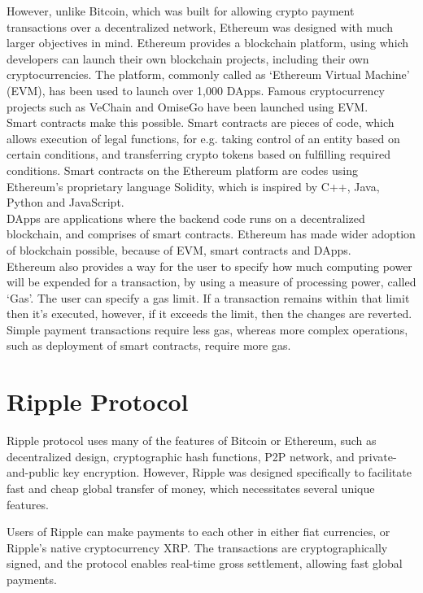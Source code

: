 However, unlike Bitcoin, which was built for allowing crypto payment transactions over a decentralized network, Ethereum was designed with much larger objectives in mind. Ethereum provides a blockchain platform, using which developers can launch their own blockchain projects, including their own cryptocurrencies. The platform, commonly called as ‘Ethereum Virtual Machine’ (EVM), has been used to launch over 1,000 DApps. Famous cryptocurrency projects such as VeChain and OmiseGo have been launched using EVM.\\
Smart contracts make this possible. Smart contracts are pieces of code, which allows execution of legal functions, for e.g. taking control of an entity based on certain conditions, and transferring crypto tokens based on fulfilling required conditions. Smart contracts on the Ethereum platform are codes using Ethereum’s proprietary language Solidity, which is inspired by C++, Java, Python and JavaScript.\\
DApps are applications where the backend code runs on a decentralized blockchain, and comprises of smart contracts. Ethereum has made wider adoption of blockchain possible, because of EVM, smart contracts and DApps.\\
Ethereum also provides a way for the user to specify how much computing power will be expended for a transaction, by using a measure of processing power, called ‘Gas’. The user can specify a gas limit. If a transaction remains within that limit then it’s executed, however, if it exceeds the limit, then the changes are reverted. Simple payment transactions require less gas, whereas more complex operations, such as deployment of smart contracts, require more gas.

\section{Ripple Protocol}
Ripple protocol uses many of the features of Bitcoin or Ethereum, such as decentralized design, cryptographic hash functions, P2P network, and private-and-public key encryption. However, Ripple was designed specifically to facilitate fast and cheap global transfer of money, which necessitates several unique features.

Users of Ripple can make payments to each other in either fiat currencies, or Ripple’s native cryptocurrency XRP. The transactions are cryptographically signed, and the protocol enables real-time gross settlement, allowing fast global payments.

